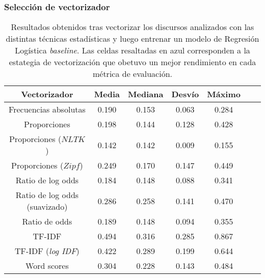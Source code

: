\subsubsection{Selecci\'on de vectorizador}
\label{appendix-table-vectorizers}

\begin{table}[!htb]
    \centering
    \begin{tabular}{ |c|c|c|c|c|c|c| }
    \hline
    Vectorizador & Media & Mediana & Desv\'io & M\'aximo \\
    \hline\hline
    Frecuencias absolutas & 0.190 & 0.153 & 0.063 & 0.284 \\
    \hline
    Proporciones & 0.198 & 0.144 & 0.128 & 0.428 \\
    \hline
    Proporciones ($NLTK$) & \cellcolor{highlight-blue!60}0.142 & \cellcolor{highlight-blue!60}0.142 & \cellcolor{highlight-blue!60}0.009 & \cellcolor{highlight-blue!60}0.155 \\
    \hline
    Proporciones ($Zipf$) & 0.249 & 0.170 & 0.147 & 0.449 \\
    \hline
    Ratio de log odds & 0.184 & 0.148 & 0.088 & 0.341 \\
    \hline
    Ratio de log odds (suavizado) & 0.286 & 0.258 & 0.141 & 0.470 \\
    \hline
    Ratio de odds & 0.189 & 0.148 & 0.094 & 0.355 \\
    \hline
    TF-IDF & \cellcolor{highlight-orange!60}0.494 & \cellcolor{highlight-orange!60}0.316 & \cellcolor{highlight-orange!60}0.285 & \cellcolor{highlight-orange!60}0.867 \\
    \hline
    TF-IDF (\textit{log IDF}) & 0.422 & 0.289 & 0.199 & 0.644 \\
    \hline
    Word scores & 0.304 & 0.228 & 0.143 & 0.484 \\
    \hline
\end{tabular}
\caption{Resultados obtenidos tras vectorizar los discursos analizados
con las distintas t\'ecnicas estad\'isticas y luego entrenar un modelo de
Regresi\'on Log\'istica \textit{baseline}. Las celdas resaltadas en azul corresponden
a la estategia de vectorizaci\'on que obetuvo un mejor rendimiento en cada
m\'etrica de evaluaci\'on.}
\label{table-appendix-fit-time}
\end{table}
\FloatBarrier


   